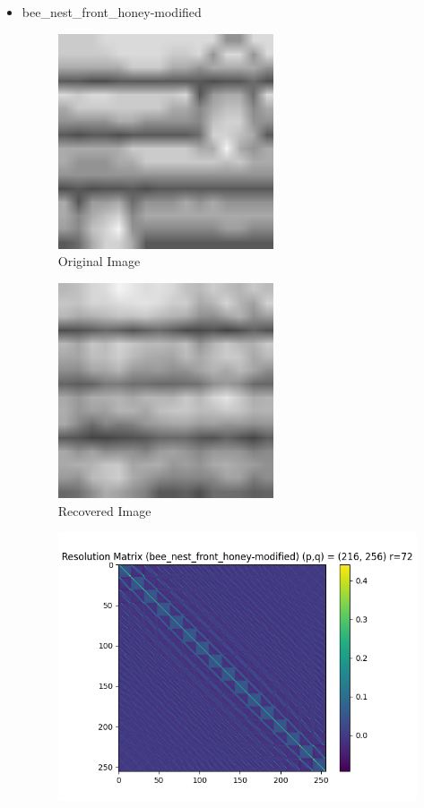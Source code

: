 \documentclass{article}
\begin{document}
\begin{itemize}
    \item bee\_nest\_front\_honey-modified
\begin{figure}[h]
    \centering
    \includegraphics[width=0.6\textwidth]{images/greyscale/bee_nest_front_honey-modified.png}
    \caption{Original Image}
\end{figure}
\begin{figure}[h]
    \centering
    \includegraphics[width=0.6\textwidth]{images/outputs/bee_nest_front_honey-modified.png}
    \caption{Recovered Image}
\end{figure}
\begin{figure}[h]
    \centering
    \includegraphics[width=1\textwidth]{images/outputs/modelres/bee_nest_front_honey-modified.png}

\end{figure}
\end{itemize}
\end{document}
